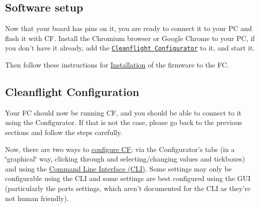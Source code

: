 \subsection*{Software setup}

Now that your board has pins on it, you are ready to connect it to your P\+C and flash it with C\+F. Install the Chromium browser or Google Chrome to your P\+C, if you don't have it already, add the \href{https://chrome.google.com/webstore/detail/cleanflight-configurator/enacoimjcgeinfnnnpajinjgmkahmfgb}{\tt Cleanflight Configurator} to it, and start it.

Then follow these instructions for \hyperlink{Installation_8md}{Installation} of the firmware to the F\+C.

\subsection*{Cleanflight Configuration}

Your F\+C should now be running C\+F, and you should be able to connect to it using the Configurator. If that is not the case, please go back to the previous sections and follow the steps carefully.

Now, there are two ways to \hyperlink{Configuration_8md}{configure C\+F}; via the Configurator's tabs (in a \char`\"{}graphical\char`\"{} way, clicking through and selecting/changing values and tickboxes) and using the \hyperlink{Cli_8md}{Command Line Interface (C\+L\+I)}. Some settings may only be configurable using the C\+L\+I and some settings are best configured using the G\+U\+I (particularly the ports settings, which aren't documented for the C\+L\+I as they're not human friendly).



